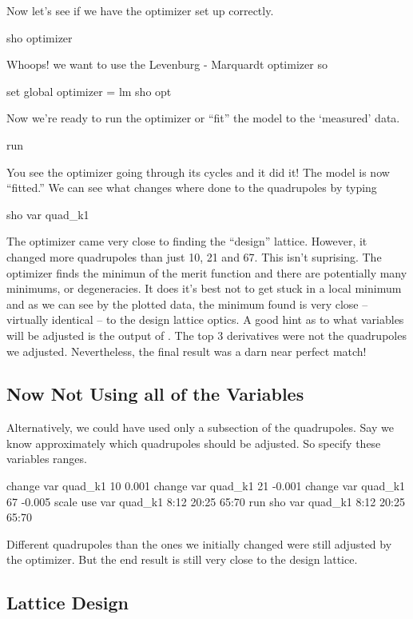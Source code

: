 Now let's see if we have the optimizer set up correctly.
\begin{example}
  sho optimizer
\end{example}
Whoops! we want to use the Levenburg - Marquardt optimizer so
\begin{example}
  set global optimizer = lm
  sho opt
\end{example}

Now we're ready to run the optimizer or ``fit'' the model to the `measured' data.
\begin{example}
  run
\end{example}
You see the optimizer going through its cycles and it did it! The model is now
``fitted.'' We can see what changes where done to the quadrupoles by typing
\begin{example}
  sho var quad\_k1
\end{example}
The optimizer came very close to finding the ``design'' lattice. However, it changed 
more quadrupoles
than just 10, 21 and 67. This isn't suprising. The optimizer finds the minimun
of the merit function and there are potentially many minimums, or degeneracies.
 It does it's best
not to get stuck in a local minimum and as we can see by the plotted data, the
minimum found is very close -- virtually identical -- to the design lattice optics. 
A good hint as to what variables will be adjusted is the output of . 
The top 3
derivatives were not the quadrupoles we adjusted. Nevertheless, the final result
was a darn near perfect match!

\subsection{Now Not Using all of the Variables}
\label{ss:fix_it}

Alternatively, we could have used only a subsection of the quadrupoles. Say we
know approximately which quadrupoles should be adjusted. So specify these
variables ranges.
\begin{example}
  change var quad\_k1 10 0.001
  change var quad\_k1 21 -0.001
  change var quad\_k1 67 -0.005
  scale
  use var quad\_k1 8:12 20:25 65:70
  run
  sho var quad\_k1 8:12 20:25 65:70
\end{example}
Different quadrupoles than the ones we initially changed were still adjusted
by the optimizer. But the end result is still very close to the design lattice.

\subsection{Lattice Design}
\label{ss:lattice_design}

